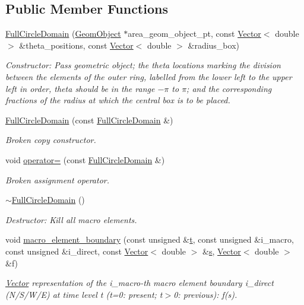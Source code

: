 \subsection*{Public Member Functions}
\begin{DoxyCompactItemize}
\item 
\hyperlink{classoomph_1_1FullCircleDomain_a35697cff7683dde517a2b8cf912a6aac}{Full\+Circle\+Domain} (\hyperlink{classoomph_1_1GeomObject}{Geom\+Object} $\ast$area\+\_\+geom\+\_\+object\+\_\+pt, const \hyperlink{classoomph_1_1Vector}{Vector}$<$ double $>$ \&theta\+\_\+positions, const \hyperlink{classoomph_1_1Vector}{Vector}$<$ double $>$ \&radius\+\_\+box)
\begin{DoxyCompactList}\small\item\em Constructor\+: Pass geometric object; the theta locations marking the division between the elements of the outer ring, labelled from the lower left to the upper left in order, theta should be in the range $-\pi$ to $\pi$; and the corresponding fractions of the radius at which the central box is to be placed. \end{DoxyCompactList}\item 
\hyperlink{classoomph_1_1FullCircleDomain_a36c2bdc01a19f511c97a89f87cd5b7dc}{Full\+Circle\+Domain} (const \hyperlink{classoomph_1_1FullCircleDomain}{Full\+Circle\+Domain} \&)
\begin{DoxyCompactList}\small\item\em Broken copy constructor. \end{DoxyCompactList}\item 
void \hyperlink{classoomph_1_1FullCircleDomain_a9293b7e09e37a9bc3cc4e495e6a22587}{operator=} (const \hyperlink{classoomph_1_1FullCircleDomain}{Full\+Circle\+Domain} \&)
\begin{DoxyCompactList}\small\item\em Broken assignment operator. \end{DoxyCompactList}\item 
\hyperlink{classoomph_1_1FullCircleDomain_afbdae044de6d958491a0b1a8cfcbc175}{$\sim$\+Full\+Circle\+Domain} ()
\begin{DoxyCompactList}\small\item\em Destructor\+: Kill all macro elements. \end{DoxyCompactList}\item 
void \hyperlink{classoomph_1_1FullCircleDomain_a93253d6c878c3ab40a582e0d2070a69d}{macro\+\_\+element\+\_\+boundary} (const unsigned \&\hyperlink{cfortran_8h_af6f0bd3dc13317f895c91323c25c2b8f}{t}, const unsigned \&i\+\_\+macro, const unsigned \&i\+\_\+direct, const \hyperlink{classoomph_1_1Vector}{Vector}$<$ double $>$ \&\hyperlink{cfortran_8h_ab7123126e4885ef647dd9c6e3807a21c}{s}, \hyperlink{classoomph_1_1Vector}{Vector}$<$ double $>$ \&f)
\begin{DoxyCompactList}\small\item\em \hyperlink{classoomph_1_1Vector}{Vector} representation of the i\+\_\+macro-\/th macro element boundary i\+\_\+direct (N/\+S/\+W/E) at time level t (t=0\+: present; t$>$0\+: previous)\+: f(s). \end{DoxyCompactList}\end{DoxyCompactItemize}
